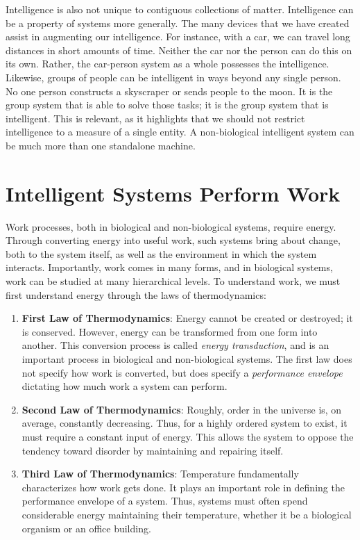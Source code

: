 Intelligence is also not unique to contiguous collections of matter. Intelligence can be a property of systems more generally. The many devices that we have created assist in augmenting our intelligence. For instance, with a car, we can travel long distances in short amounts of time. Neither the car nor the person can do this on its own. Rather, the car-person system as a whole possesses the intelligence. Likewise, groups of people can be intelligent in ways beyond any single person. No one person constructs a skyscraper or sends people to the moon. It is the group system that is able to solve those tasks; it is the group system that is intelligent. This is relevant, as it highlights that we should not restrict intelligence to a measure of a single entity. A non-biological intelligent system can be much more than one standalone machine.



\section{Intelligent Systems Perform Work}

Work processes, both in biological and non-biological systems, require energy. Through converting energy into useful work, such systems bring about change, both to the system itself, as well as the environment in which the system interacts. Importantly, work comes in many forms, and in biological systems, work can be studied at many hierarchical levels. To understand work, we must first understand energy through the laws of thermodynamics:
\begin{enumerate}
    \item \textbf{First Law of Thermodynamics}: Energy cannot be created or destroyed; it is conserved. However, energy can be transformed from one form into another. This conversion process is called \textit{energy transduction}, and is an important process in biological and non-biological systems. The first law does not specify how work is converted, but does specify a \textit{performance envelope} dictating how much work a system can perform.
    
    \item \textbf{Second Law of Thermodynamics}: Roughly, order in the universe is, on average, constantly decreasing. Thus, for a highly ordered system to exist, it must require a constant input of energy. This allows the system to oppose the tendency toward disorder by maintaining and repairing itself.
    
    \item \textbf{Third Law of Thermodynamics}: Temperature fundamentally characterizes how work gets done. It plays an important role in defining the performance envelope of a system. Thus, systems must often spend considerable energy maintaining their temperature, whether it be a biological organism or an office building.
\end{enumerate}

